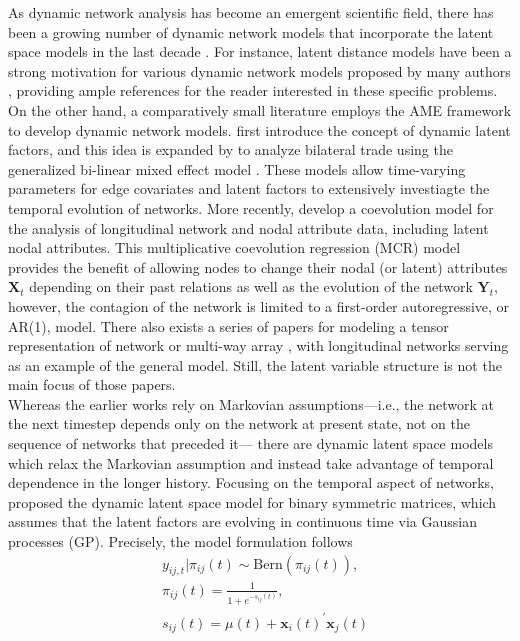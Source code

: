 \documentclass[a4paper]{article}
\begin{document}
As dynamic network analysis has become an emergent scientific field, there has been a growing number of dynamic network models that incorporate the latent space models in the last decade \citep{kim2017review}. For instance, latent distance models have been a strong motivation for various dynamic network models proposed by many authors \citep{sarkar2005dynamic,sarkar2007latent,sewell2015latent,sewell2016latent,friel2016interlocking}, providing ample references for the reader interested in these specific problems. On the other hand, a comparatively small literature employs the AME framework to develop dynamic network models. \cite{ward2007persistent} first introduce the concept of dynamic latent factors, and this idea is expanded by \cite{ward2013gravity} to analyze bilateral trade using the generalized bi-linear mixed effect model \citep{hoff2005bilinear}. These models allow time-varying parameters for edge covariates and latent factors to extensively investiagte the temporal evolution of networks. More recently, \cite{he2017multiplicative} develop a coevolution model for the analysis of longitudinal network and nodal attribute data, including latent nodal attributes. This multiplicative coevolution regression (MCR) model provides the benefit of allowing nodes to change their nodal (or latent) attributes $\mathbf{X}_t$ depending on their past relations as well as the evolution of the network $\mathbf{Y}_t$, however, the contagion of the network is limited to a first-order autoregressive, or AR(1), model. There also exists a series of papers for modeling a tensor representation of network or multi-way array \citep{hoff2011hierarchical,hoff2011separable,hoff2015multilinear,minhas2016new}, with longitudinal networks serving as an example of the general model. Still, the latent variable structure is not the main focus of those papers. \\ \newline
Whereas the earlier works rely on Markovian assumptions---i.e., the network at the next timestep depends only on the network at present state, not on the sequence of networks that preceded it--- there are dynamic latent space models which relax the Markovian assumption and instead take advantage of temporal dependence in the longer history. Focusing on the temporal aspect of networks, \cite{durante2013nonparametric} proposed the dynamic latent space model for binary symmetric matrices, which 
		assumes that the latent factors are evolving in continuous time via Gaussian processes (GP). Precisely, the model formulation follows
		\begin{equation}\label{DuranteDunson}
			\begin{aligned}
				&y_{ij, t}|\pi_{ij}(t) \sim \mbox{Bern}(\pi_{ij}(t)),\\
				& \pi_{ij}(t) = \frac{1}{1+e^{-s_{ij}(t)}},\\
				& s_{ij}(t) = \mu(t) + \boldsymbol{x}_i(t)^\prime \boldsymbol{x}_j(t)
			\end{aligned}
		\end{equation}
\end{document}
